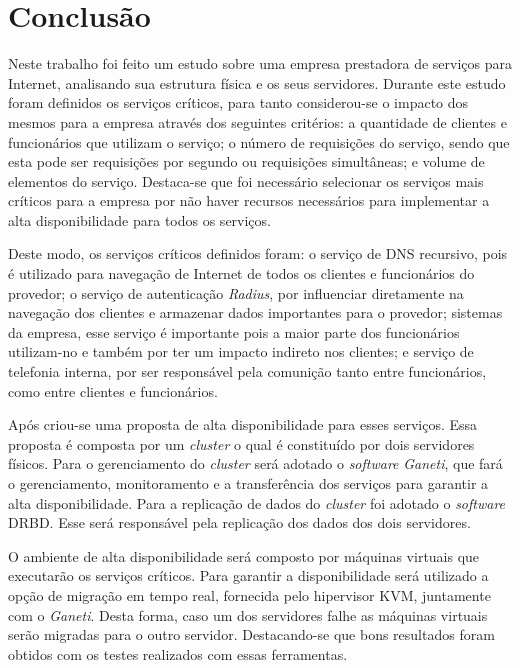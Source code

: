 \chapter{Conclusão}
\label{cap:conclusao}

Neste trabalho foi feito um estudo sobre uma empresa prestadora de serviços para Internet, analisando sua estrutura física e os seus servidores. 
Durante este estudo foram definidos os serviços críticos, para tanto considerou-se o impacto dos mesmos para a empresa através dos seguintes 
critérios: a quantidade de clientes e funcionários que utilizam o serviço; o número de requisições do serviço, sendo que esta pode ser requisições 
por segundo ou requisições simultâneas; e volume de elementos do serviço.
Destaca-se que foi necessário selecionar os serviços mais críticos para a empresa por não haver recursos necessários para implementar a
alta disponibilidade para todos os serviços.

Deste modo, os serviços críticos definidos foram: o serviço de \ac{DNS} recursivo, pois é utilizado para navegação de Internet de todos os clientes 
e funcionários do provedor; o serviço de autenticação \textit{Radius}, por influenciar diretamente na navegação dos clientes e armazenar dados 
importantes para o provedor; sistemas da empresa, esse serviço é importante pois a maior parte dos funcionários utilizam-no e também por ter um 
impacto indireto nos clientes; e serviço de telefonia interna, por ser responsável pela comunição tanto entre funcionários, como entre clientes 
e funcionários.

Após criou-se uma proposta de alta disponibilidade para esses serviços. Essa proposta é composta por um \textit{cluster} o qual é constituído 
por dois servidores físicos. Para o gerenciamento do \textit{cluster} será adotado o \textit{software} \textit{Ganeti}, que fará o gerenciamento, 
monitoramento e a transferência dos serviços para garantir a alta disponibilidade. Para a replicação de dados do \textit{cluster} foi adotado 
o \textit{software} \ac{DRBD}. Esse será responsável pela replicação dos dados dos dois servidores.

O ambiente de alta disponibilidade será composto por máquinas virtuais que executarão os serviços críticos. Para garantir a disponibilidade 
será utilizado a opção de migração em tempo real, fornecida pelo hipervisor \ac{KVM}, juntamente com o \textit{Ganeti}. Desta forma, 
caso um dos servidores falhe as máquinas virtuais serão migradas para o outro servidor. Destacando-se que bons resultados foram obtidos com os 
testes realizados com essas ferramentas.

